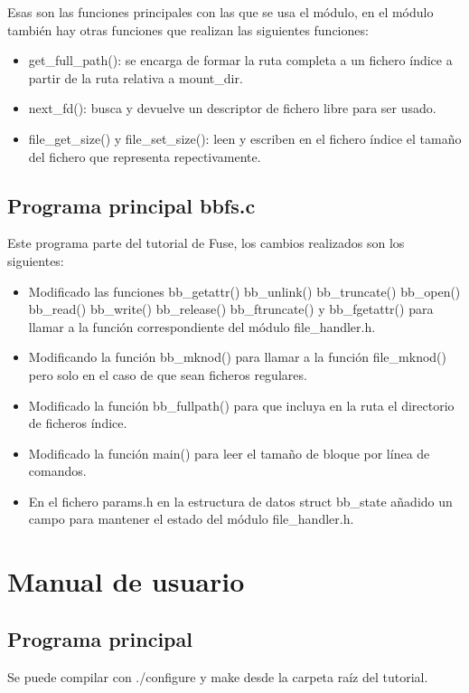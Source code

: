 \documentclass[a4paper,12pt]{article}
\begin{document}
Esas son las funciones principales con las que se usa el módulo, en el módulo también hay otras funciones que realizan las siguientes funciones:

\begin{itemize}
\item get\_full\_path(): se encarga de formar la ruta completa a un fichero índice a partir de la ruta relativa a mount\_dir.

\item next\_fd(): busca y devuelve un descriptor de fichero libre para ser usado.

\item file\_get\_size() y file\_set\_size(): leen y escriben en el fichero índice el tamaño del fichero que representa repectivamente.
\end{itemize}

\subsection{Programa principal bbfs.c}

Este programa parte del tutorial de Fuse, los cambios realizados son los siguientes:


\begin{itemize}
\item Modificado las funciones bb\_getattr() bb\_unlink() bb\_truncate() bb\_open() bb\_read() bb\_write() bb\_release() bb\_ftruncate() y bb\_fgetattr() para llamar a la función correspondiente del módulo file\_handler.h.
\item Modificando la función bb\_mknod() para llamar a la función file\_mknod() pero solo en el caso de que sean ficheros regulares.
\item Modificado la función bb\_fullpath() para que incluya en la ruta el directorio de ficheros índice.
\item Modificado la función main() para leer el tamaño de bloque por línea de comandos.
\item En el fichero params.h en la estructura de datos struct bb\_state añadido un campo para mantener el estado del módulo file\_handler.h.
\end{itemize}




\section{Manual de usuario}

\subsection{Programa principal}
Se puede compilar con ./configure y make desde la carpeta raíz del tutorial.
\bigskip
\end{document}
